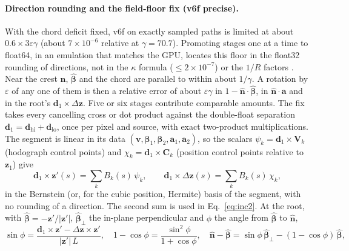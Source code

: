 \documentclass[11pt, a4paper]{article}
\begin{document}
\paragraph{Direction rounding and the field-floor fix (v6f precise).} With the chord deficit fixed, v6f on exactly sampled paths is limited at about $0.6\times 3\varepsilon\gamma$ (about $7\times10^{-6}$ relative at $\gamma = 70.7$). Promoting stages one at a time to float64, in an emulation that matches the GPU, locates this floor in the float32 rounding of directions, not in the $\kappa$ formula ($\le 2\times10^{-7}$) or the $1/R$ factors \cite{swarm2026}. Near the crest $\hat{\mathbf{n}}$, $\hat{\boldsymbol{\beta}}$ and the chord are parallel to within about $1/\gamma$. A rotation by $\varepsilon$ of any one of them is then a relative error of about $\varepsilon\gamma$ in $1 - \hat{\mathbf{n}}\cdot\hat{\boldsymbol{\beta}}$, in $\hat{\mathbf{n}}\cdot\mathbf{a}$ and in the root's $\mathbf{d}_1 \times \Delta\mathbf{z}$. Five or six stages contribute comparable amounts. The fix takes every cancelling cross or dot product against the double-float separation $\mathbf{d}_1 = \mathbf{d}_{\text{hi}} + \mathbf{d}_{\text{lo}}$, once per pixel and source, with exact two-product multiplications. The segment is linear in its data $(\mathbf{v}, \boldsymbol{\beta}_1, \boldsymbol{\beta}_2, \mathbf{a}_1, \mathbf{a}_2)$, so the scalars $\psi_k = \mathbf{d}_1 \times \mathbf{V}_k$ (hodograph control points) and $\chi_k = \mathbf{d}_1 \times \mathbf{C}_k$ (position control points relative to $\mathbf{z}_1$) give
\begin{equation}
\mathbf{d}_1 \times \mathbf{z}'(s) = \sum_k B_k(s)\,\psi_k, \qquad \mathbf{d}_1 \times \Delta\mathbf{z}(s) = \sum_k B_k(s)\,\chi_k ,
\label{eq:psichi}
\end{equation}
in the Bernstein (or, for the cubic position, Hermite) basis of the segment, with no rounding of a direction. The second sum is used in Eq.~\eqref{eq:inc2}. At the root, with $\hat{\boldsymbol{\beta}} = -\mathbf{z}'/|\mathbf{z}'|$, $\hat{\boldsymbol{\beta}}_\perp$ the in-plane perpendicular and $\phi$ the angle from $\hat{\boldsymbol{\beta}}$ to $\hat{\mathbf{n}}$,
\begin{equation}
\sin\phi = \frac{\mathbf{d}_1 \times \mathbf{z}' - \Delta\mathbf{z} \times \mathbf{z}'}{|\mathbf{z}'|\,L}, \quad
1 - \cos\phi = \frac{\sin^2\phi}{1 + \cos\phi}, \quad
\hat{\mathbf{n}} - \hat{\boldsymbol{\beta}} = \sin\phi\,\hat{\boldsymbol{\beta}}_\perp - (1 - \cos\phi)\,\hat{\boldsymbol{\beta}},
\label{eq:angles}
\end{equation}
\end{document}
